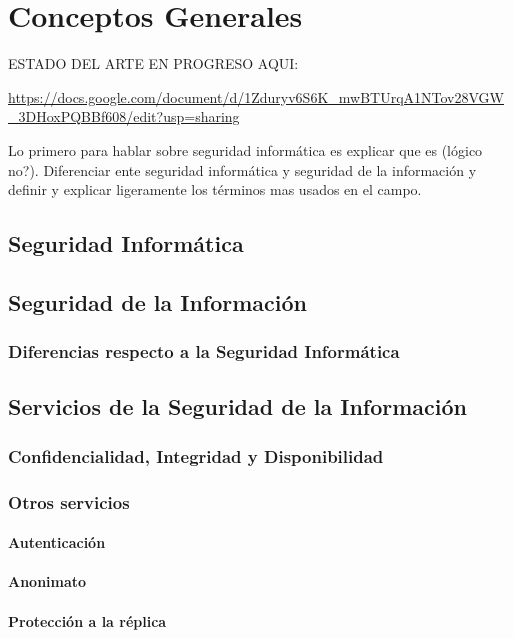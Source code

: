 \chapter{Conceptos Generales}

{\color{red}ESTADO DEL ARTE EN PROGRESO AQUI:}

\url{https://docs.google.com/document/d/1Zduryv6S6K_mwBTUrqA1NTov28VGW_3DHoxPQBBf608/edit?usp=sharing}

{\color{red} Lo primero para hablar sobre seguridad informática es explicar que es (lógico no?). Diferenciar ente seguridad informática y seguridad de la información y definir y explicar ligeramente los términos mas usados en el campo.}

\section{Seguridad Informática}


\section{Seguridad de la Información}

\subsection{Diferencias respecto a la Seguridad Informática}


\section{Servicios de la Seguridad de la Información}

\subsection[CID]{Confidencialidad, Integridad y Disponibilidad}

\subsection{Otros servicios}

\subsubsection{Autenticación}

\subsubsection{Anonimato}

\subsubsection{Protección a la réplica}